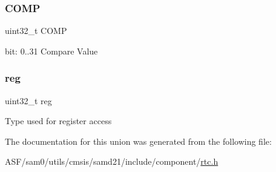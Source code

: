 \subsubsection{\texorpdfstring{COMP}{COMP}}
{\footnotesize\ttfamily uint32\+\_\+t C\+O\+MP}

bit\+: 0..31 Compare Value \mbox{\label{union_r_t_c___m_o_d_e0___c_o_m_p___type_a6b91636401516a477989a336376d7b40}} 
\subsubsection{\texorpdfstring{reg}{reg}}
{\footnotesize\ttfamily uint32\+\_\+t reg}

Type used for register access 

The documentation for this union was generated from the following file\+:\begin{DoxyCompactItemize}
\item 
A\+S\+F/sam0/utils/cmsis/samd21/include/component/\mbox{\hyperlink{component_2rtc_8h}{rtc.\+h}}\end{DoxyCompactItemize}
